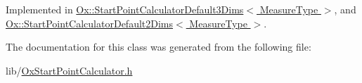 Implemented in \hyperlink{class_ox_1_1_start_point_calculator_default3_dims_ad2d60ec81810eb5b0368834e15d031bd}{Ox\-::\-Start\-Point\-Calculator\-Default3\-Dims$<$ Measure\-Type $>$}, and \hyperlink{class_ox_1_1_start_point_calculator_default2_dims_a4a3518c3b4d8f329784caa0e2f6e9165}{Ox\-::\-Start\-Point\-Calculator\-Default2\-Dims$<$ Measure\-Type $>$}.



The documentation for this class was generated from the following file\-:\begin{DoxyCompactItemize}
\item 
lib/\hyperlink{_ox_start_point_calculator_8h}{Ox\-Start\-Point\-Calculator.\-h}\end{DoxyCompactItemize}

